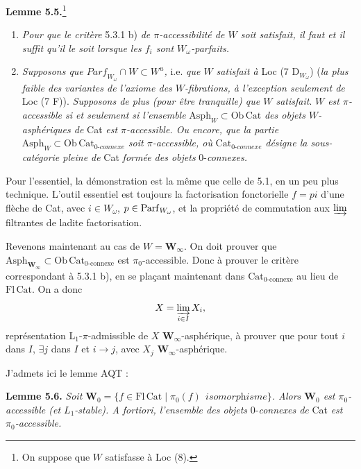 \textbf{Lemme 5.5.}\footnote[40]{On suppose que $W$ satisfasse à Loc (8).}
\begin{enumerate}[label={}]
\item[a)] \textit{Pour que le critère} 5.3.1 b) \textit{de $\pi$-accessibilité de $W$ soit satisfait, il faut et il suffit qu'il le soit lorsque les $f_i$ sont $W_\omega$-parfaits.}
\item[b)] \textit{Supposons que $\mathit{Parf}_{W_\omega} \cap W \subset W^u$,} i.e. \textit{que $W$ satisfait à} Loc (7 $\mathrm{D}_{W_\omega}$) (\textit{la plus faible des variantes de l'axiome des $W$-fibrations, à l'exception seulement de} Loc (7 F)). \textit{Supposons de plus (pour être tranquille) que $W$ satisfait}. \textit{$W$ est $\pi$-accessible si et seulement si l'ensemble} $\mathrm{Asph}_W \subset \mathrm{Ob}\,\mathrm{Cat}$ \textit{des objets $W$-asphériques de} Cat \textit{est $\pi$-accessible. Ou encore, que la partie} $\mathrm{Asph}_W \subset \mathrm{Ob}\,\mathrm{Cat}_{\textit{0-connexe}}$ \textit{soit $\pi$-accessible, où} $\mathrm{Cat}_{\textit{0-connexe}}$ \textit{désigne la sous-catégorie pleine de} Cat \textit{formée des objets} 0-\textit{connexes.}
\end{enumerate}
Pour l'essentiel, la démonstration est la même que celle de 5.1, en un peu plus technique. L'outil essentiel est toujours la factorisation fonctorielle $f = pi$ d'une flèche de Cat, avec $i \in W_\omega$, $p \in \mathrm{Parf}_{W_\omega}$, et la propriété de
commutation aux $\varinjlim$ filtrantes de ladite factorisation.

Revenons maintenant au cas de $W = \mathbf{W}_\infty$. On doit prouver que $\mathrm{Asph}_{\mathbf{W}_\infty} \subset \mathrm{Ob}\,\mathrm{Cat}_{\text{0-connexe}}$ est $\pi_0$-accessible. Donc à prouver le critère correspondant à 5.3.1 b), en se plaçant maintenant dans $\mathrm{Cat}_{\text{0-connexe}}$ au lieu de $\mathrm{Fl}\,\mathrm{Cat}$. On a donc
\[
X = \varinjlim_{i\in I} X_i,
\]
représentation L$_1$-$\pi$-admissible de $X$ $\mathbf{W}_\infty$-asphérique, à prouver que pour tout $i$ dans $I$, $\exists j$ dans $I$ et $i \longrightarrow j$, avec $X_j$ $\mathbf{W}_\infty$-asphérique.

J'admets ici le lemme AQT :

\textbf{Lemme 5.6.} \textit{Soit $\mathbf{W}_0 = \{f \in \mathrm{Fl}\,\mathrm{Cat} \mid \pi_0(f) \ \ \textit{isomorphisme}\}$. Alors $\mathbf{W}_0$ est $\pi_0$-accessible (et $L_1$-stable). A fortiori, l'ensemble des objets} 0-\textit{connexes de} Cat \textit{est $\pi_0$-accessible.}

